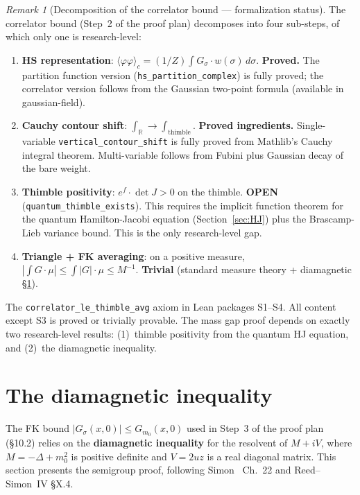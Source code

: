 \documentclass[12pt]{article}
\theoremstyle{definition}
\theoremstyle{remark}
\newtheorem{remark}[theorem]{Remark}
\newcommand{\R}{\mathbb{R}}
\newcommand{\ph}{\varphi}
\begin{document}
\begin{remark}[Decomposition of the correlator bound --- formalization status]
\label{rem:decomposition}
The correlator bound (Step~2 of the proof plan) decomposes into
four sub-steps, of which only one is research-level:

\begin{enumerate}
\item[\textbf{S1.}] \textbf{HS representation}: $\langle\ph\ph\rangle_c
  = (1/Z)\int G_\sigma \cdot w(\sigma)\,d\sigma$.
  \textbf{Proved.} The partition function version (\texttt{hs\_partition\_complex})
  is fully proved; the correlator version follows from the Gaussian two-point
  formula (available in gaussian-field).

\item[\textbf{S2.}] \textbf{Cauchy contour shift}: $\int_\R \to \int_{\text{thimble}}$.
  \textbf{Proved ingredients.} Single-variable \texttt{vertical\_contour\_shift}
  is fully proved from Mathlib's Cauchy integral theorem. Multi-variable
  follows from Fubini plus Gaussian decay of the bare weight.

\item[\textbf{S3.}] \textbf{Thimble positivity}: $e^f \cdot \det J > 0$ on the thimble.
  \textbf{OPEN} (\texttt{quantum\_thimble\_exists}).
  This requires the implicit function theorem for the quantum Hamilton-Jacobi
  equation (Section~\ref{sec:HJ}) plus the Brascamp-Lieb variance bound.
  This is the only research-level gap.

\item[\textbf{S4.}] \textbf{Triangle + FK averaging}: on a positive measure,
  $|\int G \cdot \mu| \le \int |G| \cdot \mu \le M^{-1}$.
  \textbf{Trivial} (standard measure theory + diamagnetic \S\ref{sec:diamagnetic}).
\end{enumerate}

The \texttt{correlator\_le\_thimble\_avg} axiom in Lean packages S1--S4.
All content except S3 is proved or trivially provable. The mass gap proof
depends on exactly two research-level results: (1)~thimble positivity
from the quantum HJ equation, and (2)~the diamagnetic inequality.
\end{remark}

\section{The diamagnetic inequality}\label{sec:diamagnetic}

The FK bound $|G_\sigma(x,0)| \le G_{m_0}(x,0)$ used in Step~3
of the proof plan (\S10.2) relies on the \textbf{diamagnetic
inequality} for the resolvent of $M + iV$, where $M = -\Delta +
m_0^2$ is positive definite and $V = 2uz$ is a real diagonal
matrix. This section presents the semigroup proof, following
Simon~\cite{Simon1979} Ch.~22 and Reed--Simon~IV \S X.4.
\end{document}
